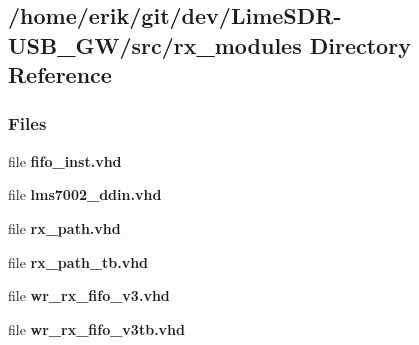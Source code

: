 \subsection{/home/erik/git/dev/\+Lime\+S\+D\+R-\/\+U\+S\+B\+\_\+\+G\+W/src/rx\+\_\+modules Directory Reference}
\label{dir_b00c474057f2078eaf5685c92ff8885e}
\subsubsection*{Files}
\begin{DoxyCompactItemize}
\item 
file {\bf fifo\+\_\+inst.\+vhd}
\item 
file {\bf lms7002\+\_\+ddin.\+vhd}
\item 
file {\bf rx\+\_\+path.\+vhd}
\item 
file {\bf rx\+\_\+path\+\_\+tb.\+vhd}
\item 
file {\bf wr\+\_\+rx\+\_\+fifo\+\_\+v3.\+vhd}
\item 
file {\bf wr\+\_\+rx\+\_\+fifo\+\_\+v3tb.\+vhd}
\end{DoxyCompactItemize}
